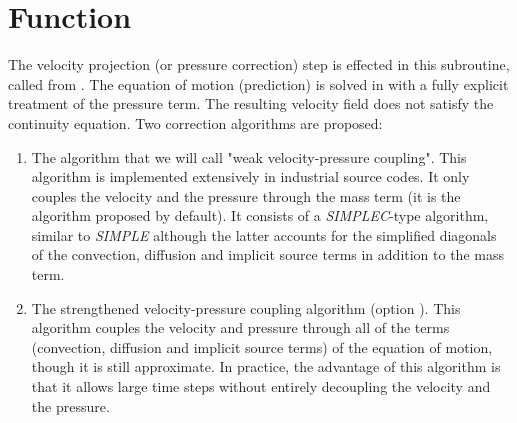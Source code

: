 
%
%
%
%


\label{ap:resopv}

\hypertarget{resopv}{}

\vspace{1cm}
\section*{Function}
The velocity projection (or pressure correction) step is effected in this subroutine, called from . The equation of motion (prediction) is solved in  with a fully explicit treatment of the pressure term. The resulting velocity field does not satisfy the continuity equation. Two correction algorithms are proposed:
\begin{enumerate}
\item The algorithm that we will call "weak velocity-pressure coupling". This algorithm is implemented extensively in industrial source codes. It only couples the velocity and the pressure through the mass term (it is the algorithm proposed by default). It consists of a \textit{SIMPLEC}-type algorithm, similar to \textit{SIMPLE} although the latter  accounts for the simplified diagonals of the convection, diffusion and implicit source terms in addition to the mass term.
\item The strengthened velocity-pressure coupling algorithm (option ). This algorithm couples the velocity and pressure through all of the terms (convection, diffusion and implicit source terms) of the equation of motion, though it is still approximate. In practice, the advantage of this algorithm is that it allows large time steps without entirely decoupling the velocity and the pressure.
\end{enumerate}

